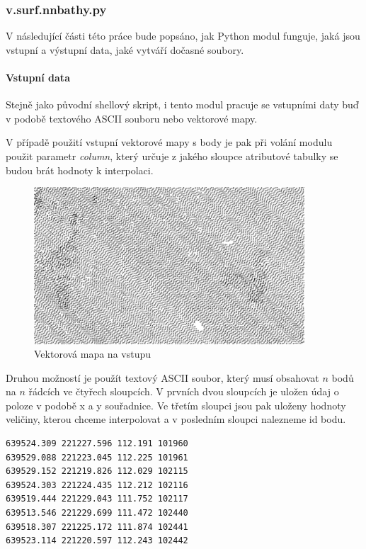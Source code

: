 \documentclass[12pt,a4paper]{article}
\begin{document}
\subsubsection{v.surf.nnbathy.py}

V následující části této práce bude popsáno, jak Python modul
funguje, jaká jsou vstupní a výstupní data, jaké vytváří dočasné
soubory.

\paragraph{Vstupní data}

Stejně jako původní shellový skript, i tento modul pracuje se vstupními
daty buď v podobě textového ASCII souboru nebo vektorové mapy.

V případě použití vstupní vektorové mapy s body je pak při volání
modulu použit parametr \emph{column}, který určuje z jakého sloupce
atributové tabulky se budou brát hodnoty k interpolaci.

\begin{figure}[h!]
\centering
\includegraphics[width=0.9\textwidth]{img/vstup_vect_map.png}
\caption{Vektorová mapa na vstupu}
\label{fig:vstup_vect_map}
\end{figure}

\newpage

Druhou možností je použít textový ASCII soubor, který musí obsahovat
$n$ bodů na $n$ řádcích ve čtyřech sloupcích. V prvních dvou sloupcích
je uložen údaj o poloze v podobě x a y souřadnice. Ve třetím sloupci
jsou pak uloženy hodnoty veličiny, kterou chceme interpolovat a v
posledním sloupci nalezneme id bodu.

\begin{lstlisting}[caption={Příklad vstupního souboru}]
639524.309 221227.596 112.191 101960
639529.088 221223.045 112.225 101961
639529.152 221219.826 112.029 102115
639524.303 221224.435 112.212 102116
639519.444 221229.043 111.752 102117
639513.546 221229.699 111.472 102440
639518.307 221225.172 111.874 102441
639523.114 221220.597 112.243 102442
\end{lstlisting}
\end{document}
